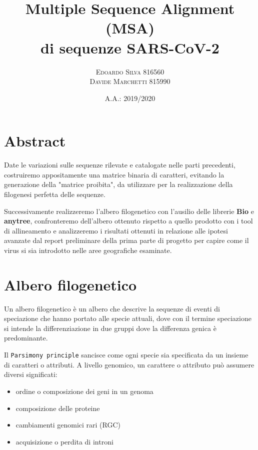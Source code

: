 \documentclass[11pt,italian]{article}
\title{Multiple Sequence Alignment (MSA) \\ di sequenze SARS-CoV-2}
\date{A.A.: 2019/2020}
\author{
    \textsc{Edoardo Silva} 816560 \\
    \textsc{Davide Marchetti} 815990
}
\begin{document}
\maketitle

\section{Abstract}
Date le variazioni sulle sequenze rilevate e catalogate nelle parti precedenti, costruiremo appositamente una matrice binaria di caratteri, evitando la generazione della "matrice proibita", da utilizzare per la realizzazione della filogenesi perfetta delle sequenze.

Successivamente realizzeremo l'albero filogenetico con l'ausilio delle librerie \textbf{Bio} e \textbf{anytree}, confronteremo dell'albero ottenuto rispetto a quello prodotto con i tool di allineamento e analizzeremo i risultati ottenuti in relazione alle ipotesi avanzate dal report preliminare della prima parte di progetto per capire come il virus si sia introdotto nelle aree geografiche esaminate.

\newpage

\section{Albero filogenetico}
Un albero filogenetico è un albero che descrive la sequenze di eventi di speciazione che hanno portato alle specie attuali, dove con il termine speciazione si intende la differenziazione in due gruppi dove la differenza genica è predominante.

Il \lstinline{Parsimony principle} sancisce come ogni specie sia specificata da un insieme di caratteri o attributi.
A livello genomico, un carattere o attributo può assumere diversi significati:
\begin{itemize}
  \item ordine o composizione dei geni in un genoma
  \item composizione delle proteine
  \item cambiamenti genomici rari (RGC)
  \item acquisizione o perdita di introni
\end{itemize}
\end{document}
